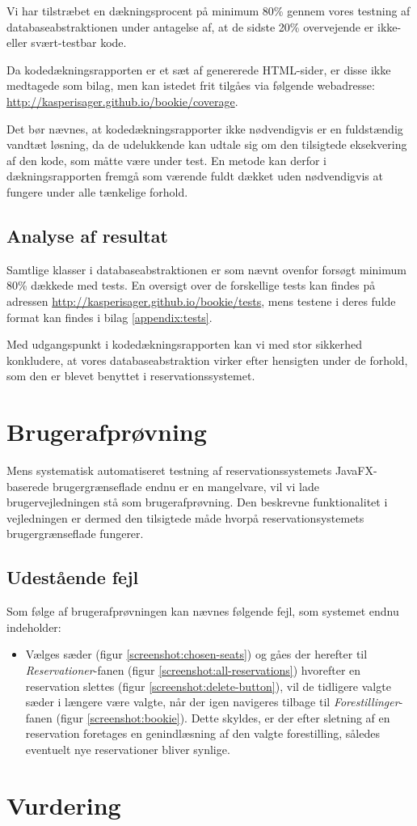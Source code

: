 Vi har tilstræbet en dækningsprocent på minimum 80\% gennem vores testning af databaseabstraktionen under antagelse af, at de sidste 20\% overvejende er ikke- eller svært-testbar kode.

Da kodedækningsrapporten er et sæt af genererede HTML-sider, er disse ikke medtagede som bilag, men kan istedet frit tilgåes via følgende webadresse: \url{http://kasperisager.github.io/bookie/coverage}.

Det bør nævnes, at kodedækningsrapporter ikke nødvendigvis er en fuldstændig vandtæt løsning, da de udelukkende kan udtale sig om den tilsigtede eksekvering af den kode, som måtte være under test. En metode kan derfor i dækningsrapporten fremgå som værende fuldt dækket uden nødvendigvis at fungere under alle tænkelige forhold.

\subsection{Analyse af resultat}

Samtlige klasser i databaseabstraktionen er som nævnt ovenfor forsøgt minimum 80\% dækkede med tests. En oversigt over de forskellige tests kan findes på adressen \url{http://kasperisager.github.io/bookie/tests}, mens testene i deres fulde format kan findes i bilag \ref{appendix:tests}.

Med udgangspunkt i kodedækningsrapporten kan vi med stor sikkerhed konkludere, at vores databaseabstraktion virker efter hensigten under de forhold, som den er blevet benyttet i reservationssystemet.

\section{Brugerafprøvning}

Mens systematisk automatiseret testning af reservationssystemets JavaFX-baserede brugergrænseflade endnu er en mangelvare, vil vi lade brugervejledningen stå som brugerafprøvning. Den beskrevne funktionalitet i vejledningen er dermed den tilsigtede måde hvorpå reservationsystemets brugergrænseflade fungerer.

\subsection{Udestående fejl}

Som følge af brugerafprøvningen kan nævnes følgende fejl, som systemet endnu indeholder:

\begin{itemize}
  \item Vælges sæder (figur \ref{screenshot:chosen-seats}) og gåes der herefter til \textit{Reservationer}-fanen (figur \ref{screenshot:all-reservations}) hvorefter en reservation slettes (figur \ref{screenshot:delete-button}), vil de tidligere valgte sæder i længere være valgte, når der igen navigeres tilbage til \textit{Forestillinger}-fanen (figur \ref{screenshot:bookie}). Dette skyldes, er der efter sletning af en reservation foretages en genindlæsning af den valgte forestilling, således eventuelt nye reservationer bliver synlige.
\end{itemize}

\section{Vurdering}